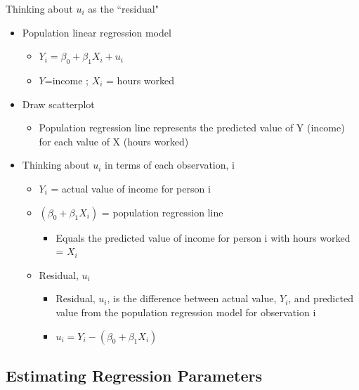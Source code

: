 \begin{frame}{Thinking about $u_{i}$ as the ``residual"}
	\begin{itemize}
	\item Population linear regression model
		\begin{itemize}
		\item $Y_{i} = \beta_{0} + \beta_{1}X_{i} + u_{i}$
		\item $Y$=income ; $X_{i}$ = hours worked
		\end{itemize}
	\item Draw scatterplot
		\begin{itemize}
		\item Population regression line represents the predicted value of Y (income) for each value of X (hours worked)
		\end{itemize}	
	\item Thinking about $u_{i}$ in terms of each observation, i
		\begin{itemize}
		\item $Y_{i}$ = actual value of income for person i
		\item $(\beta_{0} + \beta_{1}X_{i})$ = population regression line
			\begin{itemize}
			\item Equals the predicted value of income for person i with hours worked = $X_{i}$
			\end{itemize}
		\item Residual, $u_{i}$
			\begin{itemize}
			\item Residual, $u_{i}$, is the difference between actual value, $Y_{i}$, and predicted value from the population regression model for observation i
			\item $u_{i} = Y_{i} - (\beta_{0} + \beta_{1}X_{i})$
			\end{itemize}
		\end{itemize}
	\end{itemize}
\end{frame}

\subsection[Estimation]{Estimating Regression Parameters}

